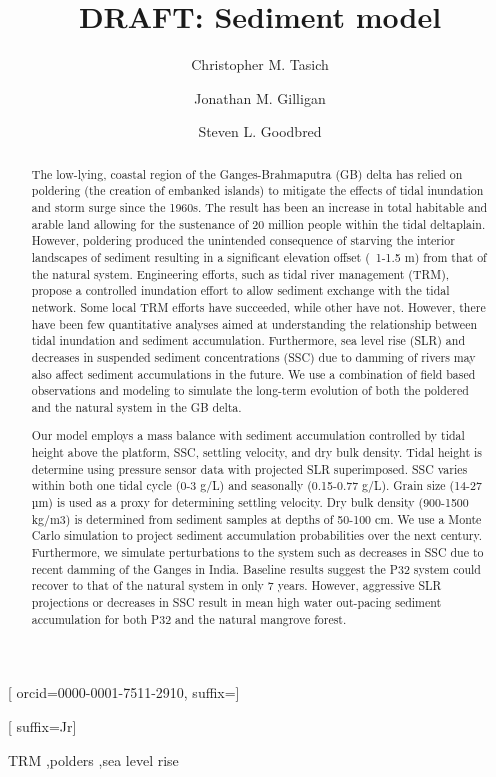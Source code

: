 \title [mode = title]{DRAFT: Sediment model}

\author{Christopher M. Tasich}[
	orcid=0000-0001-7511-2910,
	suffix=]
\cormark[1]

\author{Jonathan M. Gilligan}
\cormark[2]

\author{Steven L. Goodbred}[
	suffix=Jr]

\address{Department of Earth \& Environmental Sciences, Vanderbilt University, Nashville TN 37235, USA}

\begin{abstract}
    The low-lying, coastal region of the Ganges-Brahmaputra (GB) delta has relied on poldering (the creation of embanked islands) to mitigate the effects of tidal inundation and storm surge since the 1960s. The result has been an increase in total habitable and arable land allowing for the sustenance of 20 million people within the tidal deltaplain. However, poldering produced the unintended consequence of starving the interior landscapes of sediment resulting in a significant elevation offset (~1-1.5 m) from that of the natural system. Engineering efforts, such as tidal river management (TRM), propose a controlled inundation effort to allow sediment exchange with the tidal network. Some local TRM efforts have succeeded, while other have not. However, there have been few quantitative analyses aimed at understanding the relationship between tidal inundation and sediment accumulation.  Furthermore, sea level rise (SLR) and decreases in suspended sediment concentrations (SSC) due to damming of rivers may also affect sediment accumulations in the future. We use a combination of field based observations and modeling to simulate the long-term evolution of both the poldered and the natural system in the GB delta.

    Our model employs a mass balance with sediment accumulation controlled by tidal height above the platform, SSC, settling velocity, and dry bulk density. Tidal height is determine using pressure sensor data with projected SLR superimposed. SSC varies within both one tidal cycle (0-3 g/L) and seasonally (0.15-0.77 g/L). Grain size (14-27 µm) is used as a proxy for determining settling velocity. Dry bulk density (900-1500 kg/m3) is determined from sediment samples at depths of 50-100 cm. We use a Monte Carlo simulation to project sediment accumulation probabilities over the next century. Furthermore, we simulate perturbations to the system such as decreases in SSC due to recent damming of the Ganges in India. Baseline results suggest the P32 system could recover to that of the natural system in only 7 years. However, aggressive SLR projections or decreases in SSC result in mean high water out-pacing sediment accumulation for both P32 and the natural mangrove forest.
  \end{abstract}


\begin{keywords}
  TRM \sep polders \sep sea level rise
\end{keywords}

\maketitle